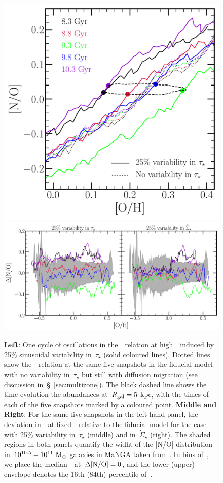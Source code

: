 \documentclass[ms.tex]{subfiles}
\begin{document}
\begin{figure}
\centering
\includegraphics[scale = 0.31]{no_oh_sfevar.pdf}
\includegraphics[scale = 0.33]{delta_no_schaefercomp.pdf}
\caption{
\textbf{Left}: One cycle of oscillations in the~\ohno~relation at
high~\oh~induced by 25\% sinusoidal variability in~$\tau_\star$ (solid coloured
lines).
Dotted lines show the~\ohno~relation at the same five snapshots in the fiducial
model with no variability in~$\tau_\star$ but still with diffusion migration
(see discussion in~\S~\ref{sec:multizone}).
The black dashed line shows the time evolution the abundances at~$R_\text{gal} = 5$
kpc, with the times of each of the five snapshots marked by a coloured point.
\textbf{Middle and Right}: For the same five snapshots in the left hand panel,
the deviation in~\no~at fixed~\oh~relative to the fiducial model for the case
with 25\% variability in~$\tau_\star$ (middle) and in~$\dot{\Sigma}_\star$
(right).
The shaded regions in both panels quantify the widht of the [N/O] distribution
in~$10^{10.5} - 10^{11}~\text{M}_\odot$ galaxies in MaNGA taken from
\citet{Schaefer2020}.
In bins of~\oh, we place the median~\no~at~$\Delta\text{[N/O]} = 0$, and the lower
(upper) envelope denotes the 16th (84th) percentile of~\no.
}
\label{fig:schaefer_comp}
\end{figure}
\end{document}
